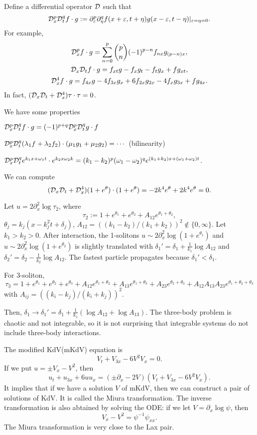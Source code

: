\documentclass{../../../small}
\begin{document}
Define a differential operator $\mathcal{D}$ such that
\[\mathcal{D}_x^p\mathcal{D}_t^qf\cdot g:=\partial_\varepsilon^p\partial_\eta^qf(x+\varepsilon,t+\eta)g(x-\varepsilon,t-\eta)|_{\varepsilon=\eta=0}.\]
For example,
\begin{gather*}
\mathcal{D}_x^pf\cdot g=\sum_{n=0}^p{p\choose n}(-1)^{p-n}f_{nx}g_{(p-n)x},\\
\mathcal{D}_x\mathcal{D}_tf\cdot g=f_{xt}g-f_xg_t-f_tg_x+fg_{xt},\\
\mathcal{D}_x^4f\cdot g=f_{4x}g-4f_{3x}g_x+6f_{2x}g_{2x}-4f_xg_{3x}+fg_{4x}.
\end{gather*}
In fact, $(\mathcal{D}_x\mathcal{D}_t+\mathcal{D}_x^4)\tau\cdot\tau=0$.

We have some properties
\begin{parts}
\item $\mathcal{D}_x^p\mathcal{D}_t^qf\cdot g=(-1)^{p+q}\mathcal{D}_x^p\mathcal{D}_t^qg\cdot f$
\item $\mathcal{D}_x^p\mathcal{D}_t^q(\lambda_1f+\lambda_2f_2)\cdot(\mu_1g_1+\mu_2g_2)=\cdots$ (bilinearity)
\item $\mathcal{D}_x^p\mathcal{D}_t^qe^{k_1x+\omega_1t}\cdot e^{k_2x\omega_2k}=(k_1-k_2)^p(\omega_1-\omega_2)^qe^{(k_1+k_2)x+(\omega_1+\omega_2)t}$.
\end{parts}
We can compute
\[(\mathcal{D}_x\mathcal{D}_t+\mathcal{D}_x^4)(1+e^\theta)\cdot(1+e^\theta)=-2k^4e^\theta+2k^4e^\theta=0.\]

Let $u=2\partial_x^2\log\tau_2$, where
\[\tau_2:=1+e^{\theta_1}+e^{\theta_2}+A_{12}e^{\theta_1+\theta_2},\]
$\theta_j=k_j(x-k_j^2t+\delta_j)$, $A_{12}=((k_1-k_2)/(k_1+k_2))^2\notin\{0,\infty\}$.
Let $k_1>k_2>0$.
After interaction, the 1-solitons $u\sim2\partial_x^2\log(1+e^{\theta_1})$ and $u\sim2\partial_x^2\log(1+e^{\theta_2})$ is slightly translated with $\delta_1'=\delta_1+\frac1{k_1}\log A_{12}$ and $\delta_2'=\delta_2-\frac1{k_2}\log A_{12}$.
The fastest particle propagates because $\delta_1'<\delta_1$.

For 3-soliton,
\[\tau_3=1+e^{\theta_1}+e^{\theta_2}+e^{\theta_3}+A_{12}e^{\theta_1+\theta_2}+A_{13}e^{\theta_1+\theta_3}+A_{23}e^{\theta_2+\theta_3}+A_{12}A_{13}A_{23}e^{\theta_1+\theta_2+\theta_3}\]
with $A_{ij}=((k_i-k_j)/(k_i+k_j))^2$.

Then, $\delta_1\to\delta_1'=\delta_1+\frac1{k_1}(\log A_{12}+\log A_{13})$.
The three-body problem is chaotic and not integrable, so it is not surprising that integrable systems do not include three-body interactions.

The modified KdV(mKdV) equation is
\[V_t+V_{3x}-6V^2V_x=0.\]
If we put $u=\pm V_x-V^2$, then
\[u_t+u_{3x}+6uu_x=(\pm\partial_x-2V)(V_t+V_{3x}-6V^2V_x).\]
It implies that if we have a solution $V$ of mKdV, then we can construct a pair of solutions of KdV.
It is called the Miura transformation.
The inverse transformation is also abtained by solving the ODE: if we let $V=\partial_x\log\psi$, then
\[V_x-V^2=\psi^{-1}\psi_{xx}.\]
The Miura transformation is very close to the Lax pair.
\end{document}
